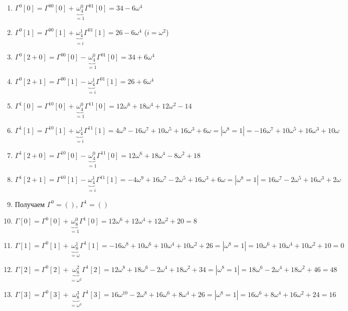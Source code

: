\documentclass[a4paper]{article}
\begin{document}
\begin{enumerate}
\begin{enumerate}
\item $\Gamma^0[0]=\Gamma^{00}[0]+\underbrace{\omega_4^0}_{=1}\Gamma^{01}[0]=34-6\omega^4$
\item $\Gamma^0[1]=\Gamma^{00}[1]+\underbrace{\omega_4^1}_{=i}\Gamma^{01}[1]=26-6\omega^4$ ($i=\omega^2$)
\item $\Gamma^0[2+0]=\Gamma^{00}[0]-\underbrace{\omega_4^0}_{=1}\Gamma^{01}[0]=34+6\omega^4$
\item $\Gamma^0[2+1]=\Gamma^{00}[1]-\underbrace{\omega_4^1}_{=i}\Gamma^{01}[1]=26+6\omega^4$
\item $\Gamma^1[0]=\Gamma^{10}[0]+\underbrace{\omega_4^0}_{=1}\Gamma^{11}[0]=12\omega^6+18\omega^4+12\omega^2-14$
\item $\Gamma^1[1]=\Gamma^{10}[1]+\underbrace{\omega_4^1}_{=i}\Gamma^{11}[1]=4\omega^9-16\omega^7+10\omega^5+16\omega^3+6\omega=|\omega^8=1|=-16\omega^7+10\omega^5+16\omega^3+10\omega$
\item $\Gamma^1[2+0]=\Gamma^{10}[0]-\underbrace{\omega_4^0}_{=1}\Gamma^{11}[0]=12\omega^6+18\omega^4-8\omega^2+18$
\item $\Gamma^1[2+1]=\Gamma^{10}[1]-\underbrace{\omega_4^1}_{=i}\Gamma^{11}[1]=-4\omega^9+16\omega^7-2\omega^5+16\omega^3+6\omega=|\omega^8=1|=16\omega^7-2\omega^5+16\omega^3+2\omega$
\item Получаем $\Gamma^0=()$, $\Gamma^1=()$
\item $\Gamma[0]=\Gamma^0[0]+\underbrace{\omega_8^0}_{=1}\Gamma^1[0]=12\omega^6+12\omega^4+12\omega^2+20=8$
\item $\Gamma[1]=\Gamma^0[1]+\underbrace{\omega_8^1}_{=\omega}\Gamma^1[1]=-16\omega^8+10\omega^6+10\omega^4+10\omega^2+26=|\omega^8=1|=10\omega^6+10\omega^4+10\omega^2+10=0$
\item $\Gamma[2]=\Gamma^0[2]+\underbrace{\omega_8^2}_{=\omega^2}\Gamma^1[2]=12\omega^8+18\omega^6-2\omega^4+18\omega^2+34=|\omega^8=1|=18\omega^6-2\omega^4+18\omega^2+46=48$
\item $\Gamma[3]=\Gamma^0[3]+\underbrace{\omega_8^3}_{=\omega^3}\Gamma^1[3]=16\omega^{10}-2\omega^8+16\omega^6+8\omega^4+26=|\omega^8=1|=16\omega^6+8\omega^4+16\omega^2+24=16$


\end{enumerate}
\end{enumerate}
\end{document}
